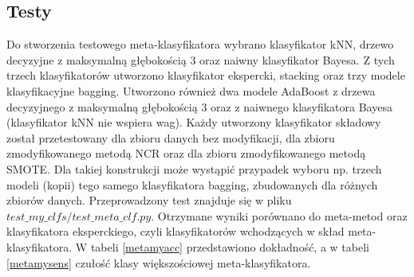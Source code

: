 \subsection{Testy}
Do stworzenia testowego meta-klasyfikatora wybrano klasyfikator kNN, drzewo decyzyjne z maksymalną głębokością 3 oraz naiwny klasyfikator Bayesa. Z tych trzech klasyfikatorów utworzono klasyfikator ekspercki, stacking oraz trzy modele klasyfikacyjne bagging. Utworzono również dwa modele AdaBoost z drzewa decyzyjnego z maksymalną głębokością 3 oraz z naiwnego klasyfikatora Bayesa (klasyfikator kNN nie wspiera wag). Każdy utworzony klasyfikator składowy został przetestowany dla zbioru danych bez modyfikacji, dla zbioru zmodyfikowanego metodą NCR oraz dla zbioru zmodyfikowanego metodą SMOTE. Dla takiej konstrukcji może wystąpić przypadek wyboru np. trzech modeli (kopii) tego samego klasyfikatora bagging, zbudowanych dla różnych zbiorów danych. Przeprowadzony test znajduje się w pliku $test\_my\_clfs/test\_meta\_clf.py$. Otrzymane wyniki porównano do meta-metod oraz klasyfikatora eksperckiego, czyli klasyfikatorów wchodzących w skład meta-klasyfikatora. W tabeli \ref{metamyacc} przedstawiono dokładność, a w tabeli \ref{metamysens} czułość klasy większościowej meta-klasyfikatora.
